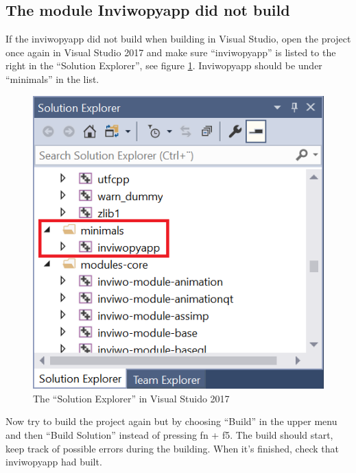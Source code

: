 \subsection{The module Inviwopyapp did not build}

If the inviwopyapp did not build when building in Visual Studio, open the project once again in Visual Studio 2017 and make sure ``inviwopyapp'' is listed to the right in the ``Solution Explorer'', see figure \ref{fig:VisStudioInviwopyapp}. Inviwopyapp should be under ``minimals'' in the list.

\begin{figure}[H]
    \centering
    \includegraphics[scale = 0.6]{Images/VisualStudioinviwopyapp.png}
    \caption{The ``Solution Explorer'' in Visual Stuido 2017}
    \label{fig:VisStudioInviwopyapp}
\end{figure}

Now try to build the project again but by choosing ``Build'' in the upper menu and then ``Build Solution'' instead of pressing fn + f5. The build should start, keep track of possible errors during the building. When it's finished, check that inviwopyapp had built.
